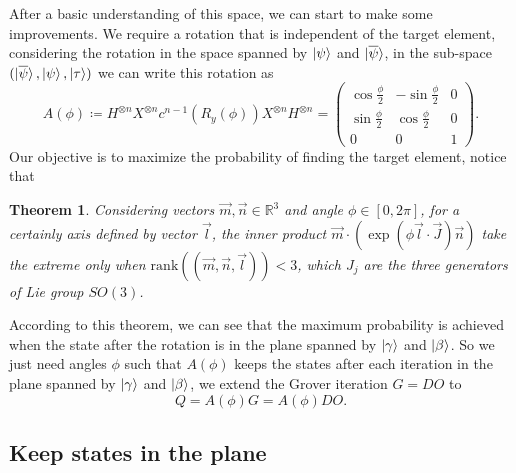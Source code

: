 \documentclass[a4paper,10pt]{book}
\newtheorem{theorem}{Theorem}[section]
\numberwithin{equation}{section}
\begin{document}
After a basic understanding of this space, we can start to make some improvements. We require a rotation that is independent of the target element, considering the rotation in the space spanned by $\ket{\psi}$ and $\ket{\overline{\psi}}$, in the sub-space $(\ket{\overline{\psi}},\ket{\psi},\ket{\tau})$ we can write this rotation as
\begin{equation}
    A(\phi)\coloneqq H^{\otimes n}X^{\otimes n}c^{n-1}\left(R_{y}(\phi)\right)X^{\otimes n}H^{\otimes n}=
    \begin{pmatrix}
        \cos\frac{\phi}{2} & -\sin\frac{\phi}{2} & 0 \\
        \sin\frac{\phi}{2} & \cos\frac{\phi}{2}  & 0 \\
        0                  & 0                   & 1
    \end{pmatrix}
    .
\end{equation}
Our objective is to maximize the probability of finding the target element, notice that
\begin{theorem}
    Considering vectors $\vec{m},\vec{n}\in\mathbb{R}^{3}$ and angle $\phi\in[0,2\pi]$, for a certainly axis defined by vector $\vec{l}$, the inner product $\vec{m}\cdot\left(\exp\left(\phi\vec{l}\cdot\vec{J}\right)\vec{n}\right)$ take the extreme only when $\mathrm{rank}\left(\left(\vec{m},\vec{n},\vec{l}\right)\right)<3$, which $J_{j}$ are the three generators of Lie group $SO(3)$.
\end{theorem}
According to this theorem, we can see that the maximum probability is achieved when the state after the rotation is in the plane spanned by $\ket{\gamma}$ and $\ket{\beta}$. So we just need angles $\phi$ such that $A(\phi)$ keeps the states after each iteration in the plane spanned by $\ket{\gamma}$ and $\ket{\beta}$, we extend the Grover iteration $G=DO$ to
\begin{equation}
    Q=A(\phi)G=A(\phi)DO.
\end{equation}



\subsection{Keep states in the plane}
\end{document}
